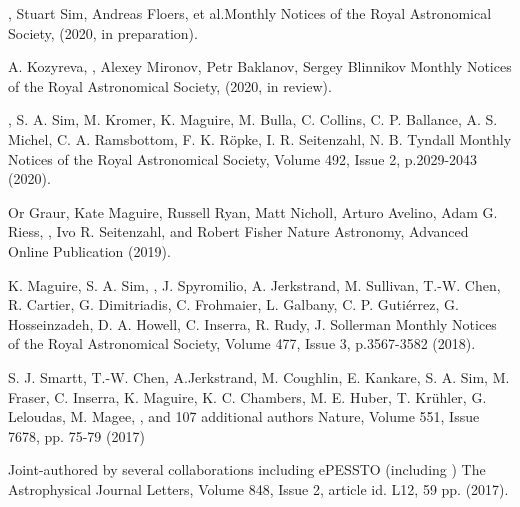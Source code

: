 {, Stuart Sim, Andreas Floers, et al.}{Monthly Notices of the Royal Astronomical Society, (2020, in preparation).}

{A. Kozyreva, , Alexey Mironov, Petr Baklanov, Sergey Blinnikov}
{Monthly Notices of the Royal Astronomical Society, (2020, in review).}

{, S. A. Sim, M. Kromer, K. Maguire, M. Bulla, C. Collins, C. P. Ballance, A. S. Michel, C. A. Ramsbottom, F. K. R\"opke, I. R. Seitenzahl, N. B. Tyndall}
{Monthly Notices of the Royal Astronomical Society, Volume 492, Issue 2, p.2029-2043 (2020).}

{Or Graur, Kate Maguire, Russell Ryan, Matt Nicholl, Arturo Avelino, Adam G. Riess, , Ivo R. Seitenzahl, and Robert Fisher}
{Nature Astronomy, Advanced Online Publication (2019).}

{K. Maguire, S. A. Sim, , J. Spyromilio, A. Jerkstrand, M. Sullivan, T.-W. Chen, R. Cartier, G. Dimitriadis, C. Frohmaier, L. Galbany, C. P. Gutiérrez, G. Hosseinzadeh, D. A. Howell, C. Inserra, R. Rudy, J. Sollerman}
{Monthly Notices of the Royal Astronomical Society, Volume 477, Issue 3, p.3567-3582 (2018).}

{S. J. Smartt, T.-W. Chen, A.Jerkstrand, M. Coughlin, E. Kankare, S. A. Sim, M. Fraser, C. Inserra, K. Maguire, K. C. Chambers,
M. E. Huber, T. Kr\"uhler, G. Leloudas, M. Magee, , and 107 additional authors}
{Nature, Volume 551, Issue 7678, pp. 75-79 (2017)}

{Joint-authored by several collaborations including ePESSTO (including )}
{The Astrophysical Journal Letters, Volume 848, Issue 2, article id. L12, 59 pp. (2017).}

